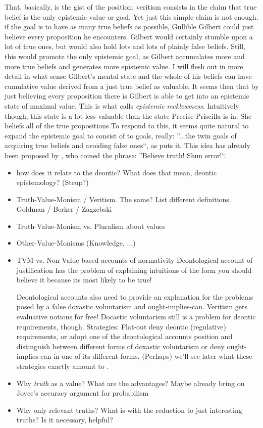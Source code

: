 \documentclass[12pt,numbers=noenddot]{scrartcl}
\begin{document}
That, basically, is the gist of the position: veritism consists in the claim that true belief is the only epistemic value or goal. Yet just this simple claim is not enough. if the goal is to have as many true beliefs as possible, Gullible Gilbert could just believe every proposition he encounters. Gilbert would certainly stumble upon a lot of true ones, but would also hold lots and lots of plainly false beliefs. Still, this would promote the only epistemic goal, as Gilbert accumulates more and more true beliefs and generates more epistemic value. I will flesh out in more detail in what sense Gilbert’s mental state and the whole of his beliefs can have cumulative value derived from a just true belief as valuable. It seems then that by just believing every proposition there is Gilbert is able to get into an epistemic state of maximal value. This is what \textcite[360]{Berker2013-BERETA-2} calls \emph{epistemic recklessness}. Intuitively though, this state is a lot less valuable than the state Precise Priscilla is in: She beliefs all of the true propositions To respond to this, it seems quite natural to expand the epistemic goal to consist of to goals, really: ”...the twin goals of acquiring true beliefs and avoiding false ones“, as \textcite[339]{Berker2013-BERETA-2} puts it. This idea has already been proposed by \textcite[17]{James1896-JAMTWT-19}, who coined the phrase: ”Believe truth! Shun error!“.
\begin{itemize}
    
    \item how does it relate to the deontic? What does that mean, deontic epistemology? (Steup?)
    \item Truth-Value-Monism / Veritism. The same? List different definitions. Goldman / Berker / Zagzebski 
    \item Truth-Value-Monism vs. Pluralism about values 
    \item Other-Value-Monisms (Knowledge, ...) 
    \item TVM vs. Non-Value-based accounts of normativity 
    Deontological account of justification has the problem of explaining intuitions of the form you should believe it because its most likely to be true!

    Deontological accounts also need to provide an explanation for the problems posed by a false doxastic voluntarism and ought-implies-can. Veritism gets evaluative notions for free! Docastic voluntarism still is a problem for deontic requirements, though. Strategies: Flat-out deny deontic (regulative) requirements, or adopt one of the deontological accounts position and distinguish between different forms of doxastic voluntarism or deny ought-implies-can in one of its different forms. (Perhaps) we'll see later what these strategies exactly amount to .
    \item Why \emph{truth} as a value? What are the advantages? Maybe already bring on Joyce's accuracy argument for probabilism 
    \item Why only relevant truths? What is with the reduction to just interesting truths? Is it necessary, helpful? 
\end{itemize}
\end{document}
